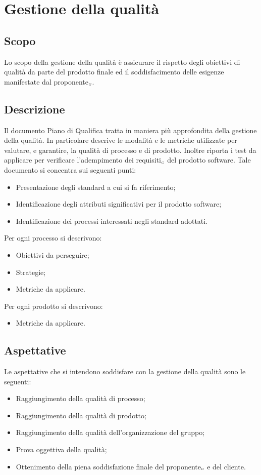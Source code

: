 \section{Gestione della qualità} \label{ProcessiDiSupportoGestioneDellaQualità}
\subsection{Scopo} \label{ProcessiDiSupportoGestioneDellaQualitàScopo}
Lo scopo della gestione della qualità è assicurare il rispetto degli obiettivi di qualità da parte del prodotto finale ed il soddisfacimento delle esigenze manifestate dal proponente$_{\scaleto{G}{3pt}}$.
\subsection{Descrizione} \label{ProcessiDiSupportoGestioneDellaQualitàDescrizione}
Il documento Piano di Qualifica tratta in maniera più approfondita della gestione della qualità. In particolare descrive le modalità e le metriche utilizzate per valutare, e garantire, la qualità di processo e di prodotto. Inoltre riporta i test da applicare per verificare l’adempimento dei requisiti$_{\scaleto{G}{3pt}}$ del prodotto software. Tale documento si concentra sui seguenti punti:
\begin{itemize}
	\item Presentazione degli standard a cui si fa riferimento;
	\item Identificazione degli attributi significativi per il prodotto software;
	\item Identificazione dei processi interessati negli standard adottati.
\end{itemize}
Per ogni processo si descrivono:
\begin{itemize}
	\item Obiettivi da perseguire;
	\item Strategie;
	\item Metriche da applicare.
\end{itemize}
Per ogni prodotto si descrivono:
\begin{itemize}
	\item Metriche da applicare.
\end{itemize}
\subsection{Aspettative} \label{ProcessiDiSupportoGestioneDellaQualitàAspettative}
Le aspettative che si intendono soddisfare con la gestione della qualità sono le seguenti:
\begin{itemize}
	\item Raggiungimento della qualità di processo;
	\item Raggiungimento della qualità di prodotto;
	\item Raggiungimento della qualità dell’organizzazione del gruppo;
	\item Prova oggettiva della qualità;
	\item Ottenimento della piena soddisfazione finale del proponente$_{\scaleto{G}{3pt}}$ e del cliente.
\end{itemize}
